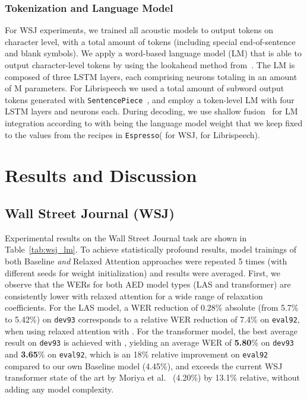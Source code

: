\documentclass{article}
\def\espresso{\texttt{Espresso}\xspace}
\def\sentencepiece{\texttt{SentencePiece}\xspace}
\begin{document}
\subsubsection{Tokenization and Language Model}	\vspace{-2mm}
For \textrm{WSJ} experiments, we trained all acoustic models to output tokens on character level, with a total amount of  tokens (including special end-of-sentence and blank symbols). We apply a word-based language model (LM) that is able to output character-level tokens by using the lookahead method from~\cite{hori2018}. The LM is composed of three LSTM layers, each comprising  neurons totaling in an amount of M parameters. 
For Librispeech we used a total amount of  subword output tokens generated with \sentencepiece~\cite{Kudo2018}, and employ a token-level LM with four LSTM layers and  neurons each. During decoding, we use shallow fusion~\cite{gulcehre2015,Toshniwal2018} for LM integration according to  with  being the language model weight that we keep fixed to the values from the recipes in \espresso ( for WSJ,  for Librispeech).

\section{Results and Discussion}\vspace{-3mm}
\subsection{Wall Street Journal (WSJ)}\vspace{-2mm}
Experimental results on the Wall Street Journal task are shown in Table~\ref{tab:wsj_lm}. To achieve statistically profound results, model trainings of both \textsf{Baseline} \textit{and} \textsf{Relaxed Attention} approaches were repeated 5 times (with different seeds for weight initialization) and results were averaged. First, we observe that the WERs for both AED model types (LAS and transformer) are consistently lower with relaxed attention for a wide range of relaxation coefficients. For the LAS model, a WER reduction of 0.28\% absolute (from 5.7\% to 5.42\%) on \texttt{dev93} corresponds to a relative WER reduction of 7.4\% on \texttt{eval92}, when using relaxed attention with . For the transformer model, the best average result on \texttt{dev93} is achieved with , yielding an average WER of \textbf{5.80}\% on \texttt{dev93} and \textbf{3.65}\% on \texttt{eval92}, which is an 18\% relative improvement on \texttt{eval92} compared to our own \textsf{Baseline} model (4.45\%), and exceeds the current WSJ transformer state of the art by Moriya et al.~\cite{moriya2020} (4.20\%) by 13.1\% relative, without adding any model complexity. 
\end{document}
